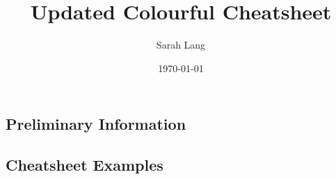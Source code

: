 \documentclass[10pt,a4paper]{article}
\title{\color{w3schools}Updated {\color{alert} Colourful} {\color{black} Cheatsheet}}
\author{Sarah Lang}
\date{\today}
\begin{document}
\small
\begin{multicols}{3}

\maketitle
\thispagestyle{empty}
\scriptsize
\tableofcontents

\section{Preliminary Information}
\subsection{Cheatsheet Examples}





\AtNextBibliography{\footnotesize}
\printbibliography  
\end{multicols}
\end{document}
